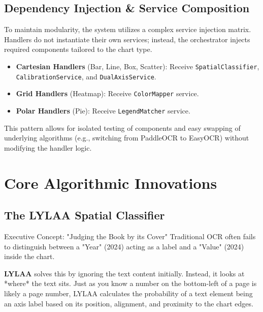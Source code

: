 \documentclass[11pt, a4paper]{report}
\begin{document}
\section{Dependency Injection \& Service Composition}
To maintain modularity, the system utilizes a complex service injection matrix. Handlers do not instantiate their own services; instead, the orchestrator injects required components tailored to the chart type.

\begin{itemize}
    \item \textbf{Cartesian Handlers} (Bar, Line, Box, Scatter): Receive \texttt{SpatialClassifier}, \texttt{CalibrationService}, and \texttt{DualAxisService}.
    \item \textbf{Grid Handlers} (Heatmap): Receive \texttt{ColorMapper} service.
    \item \textbf{Polar Handlers} (Pie): Receive \texttt{LegendMatcher} service.
\end{itemize}

This pattern allows for isolated testing of components and easy swapping of underlying algorithms (e.g., switching from PaddleOCR to EasyOCR) without modifying the handler logic.

\chapter{Core Algorithmic Innovations}

\section{The LYLAA Spatial Classifier}

\begin{conceptbox}{Executive Concept: "Judging the Book by its Cover"}
Traditional OCR often fails to distinguish between a "Year" (2024) acting as a label and a "Value" (2024) inside the chart. 

\textbf{LYLAA} solves this by ignoring the text content initially. Instead, it looks at *where* the text sits. Just as you know a number on the bottom-left of a page is likely a page number, LYLAA calculates the probability of a text element being an axis label based on its position, alignment, and proximity to the chart edges.
\end{conceptbox}
\end{document}
